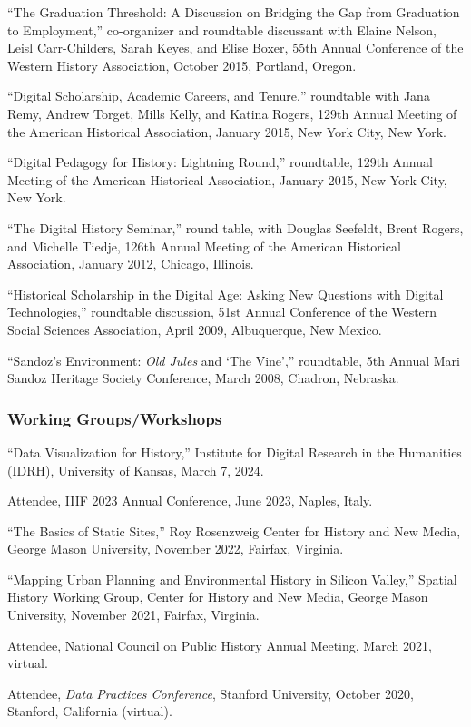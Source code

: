 ``The Graduation Threshold: A Discussion on Bridging the Gap from
Graduation to Employment,'' co-organizer and roundtable discussant with
Elaine Nelson, Leisl Carr-Childers, Sarah Keyes, and Elise Boxer, 55th
Annual Conference of the Western History Association, October 2015,
Portland, Oregon.

``Digital Scholarship, Academic Careers, and Tenure,'' roundtable with
Jana Remy, Andrew Torget, Mills Kelly, and Katina Rogers, 129th Annual
Meeting of the American Historical Association, January 2015, New York
City, New York.

``Digital Pedagogy for History: Lightning Round,'' roundtable, 129th
Annual Meeting of the American Historical Association, January 2015, New
York City, New York.

``The Digital History Seminar,'' round table, with Douglas Seefeldt,
Brent Rogers, and Michelle Tiedje, 126th Annual Meeting of the American
Historical Association, January 2012, Chicago, Illinois.

``Historical Scholarship in the Digital Age: Asking New Questions with
Digital Technologies,'' roundtable discussion, 51st Annual Conference of
the Western Social Sciences Association, April 2009, Albuquerque, New
Mexico.

``Sandoz's Environment: \emph{Old Jules} and `The Vine','' roundtable,
5th Annual Mari Sandoz Heritage Society Conference, March 2008, Chadron,
Nebraska.

\subsubsection{Working Groups/Workshops}\label{working-groupsworkshops}

``Data Visualization for History,'' Institute for Digital Research in
the Humanities (IDRH), University of Kansas, March 7, 2024.

Attendee, IIIF 2023 Annual Conference, June 2023, Naples, Italy.

``The Basics of Static Sites,'' Roy Rosenzweig Center for History and
New Media, George Mason University, November 2022, Fairfax, Virginia.

``Mapping Urban Planning and Environmental History in Silicon Valley,''
Spatial History Working Group, Center for History and New Media, George
Mason University, November 2021, Fairfax, Virginia.

Attendee, National Council on Public History Annual Meeting, March 2021,
virtual.

Attendee, \emph{Data Practices Conference}, Stanford University, October
2020, Stanford, California (virtual).

